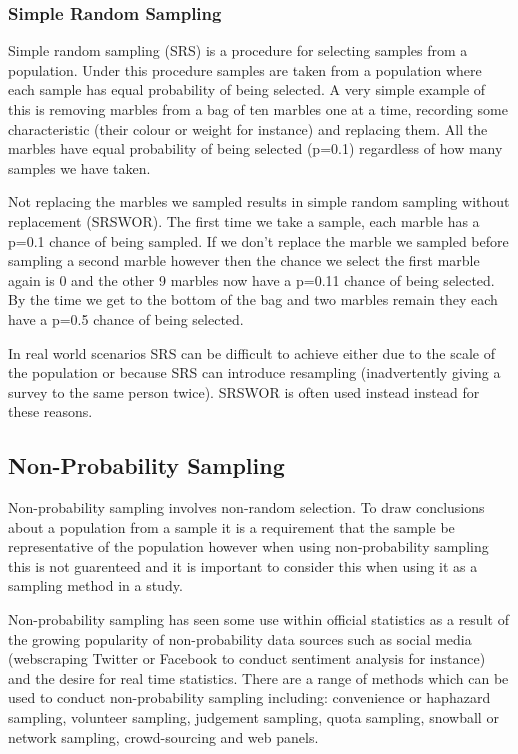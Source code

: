 \documentclass[
]{book}
\begin{document}
\hypertarget{simple-random-sampling}{%
\subsubsection{Simple Random Sampling}\label{simple-random-sampling}}

Simple random sampling (SRS) is a procedure for selecting samples from a population. Under this procedure samples are taken from a population where each sample has equal probability of being selected. A very simple example of this is removing marbles from a bag of ten marbles one at a time, recording some characteristic (their colour or weight for instance) and replacing them. All the marbles have equal probability of being selected (p=0.1) regardless of how many samples we have taken.

Not replacing the marbles we sampled results in simple random sampling without replacement (SRSWOR). The first time we take a sample, each marble has a p=0.1 chance of being sampled. If we don't replace the marble we sampled before sampling a second marble however then the chance we select the first marble again is 0 and the other 9 marbles now have a p=0.11 chance of being selected. By the time we get to the bottom of the bag and two marbles remain they each have a p=0.5 chance of being selected.

In real world scenarios SRS can be difficult to achieve either due to the scale of the population or because SRS can introduce resampling (inadvertently giving a survey to the same person twice). SRSWOR is often used instead instead for these reasons.

\hypertarget{non-probability-sampling}{%
\subsection{Non-Probability Sampling}\label{non-probability-sampling}}

Non-probability sampling involves non-random selection. To draw conclusions about a population from a sample it is a requirement that the sample be representative of the population however when using non-probability sampling this is not guarenteed and it is important to consider this when using it as a sampling method in a study.

Non-probability sampling has seen some use within official statistics as a result of the growing popularity of non-probability data sources such as social media (webscraping Twitter or Facebook to conduct sentiment analysis for instance) and the desire for real time statistics. There are a range of methods which can be used to conduct non-probability sampling including: convenience or haphazard sampling, volunteer sampling, judgement sampling, quota sampling, snowball or network sampling, crowd-sourcing and web panels.
\end{document}
